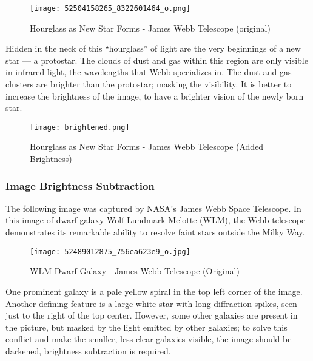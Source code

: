 \begin{figure}[H]
	\centering
	\texttt{[image: 52504158265\_8322601464\_o.png]}
	\caption{ Hourglass as New Star Forms - James Webb Telescope (original) \cite{jwbbrighter} }
	\label{fig:resultsjwbbrighten}  
\end{figure}

\par Hidden in the neck of this “hourglass” of light are the very beginnings of a new star — a protostar. The clouds of dust and gas within this region are only visible in infrared light, the wavelengths that Webb specializes in. The dust and gas clusters are brighter than the protostar; masking the visibility. It is better to increase the brightness of the image, to have a brighter vision of the newly born star. \newline

\begin{figure}[H]
	\centering
	\texttt{[image: brightened.png]}
	\caption{ Hourglass as New Star Forms - James Webb Telescope (Added Brightness) \cite{jwbbrighter} }
	\label{fig:resultsjwbbrightened}  
\end{figure}

\subsubsection{Image Brightness Subtraction}
\par The following image was captured by NASA's James Webb Space Telescope. In this image of dwarf galaxy Wolf-Lundmark-Melotte (WLM), the Webb telescope demonstrates its remarkable ability to resolve faint stars outside the Milky Way. \newline

\begin{figure}[H]
	\centering
	\texttt{[image: 52489012875\_756ea623e9\_o.jpg]}
	\caption{ WLM Dwarf Galaxy - James Webb Telescope (Original) \cite{jwbdarker} }
	\label{fig:resultsjwbdarken}  
\end{figure}

\par One prominent galaxy is a pale yellow spiral in the top left corner of the image. Another defining feature is a large white star with long diffraction spikes, seen just to the right of the top center. However, some other galaxies are present in the picture, but masked by the light emitted by other galaxies; to solve this conflict and make the smaller, less clear galaxies visible, the image should be darkened, brightness subtraction is required. \newline

